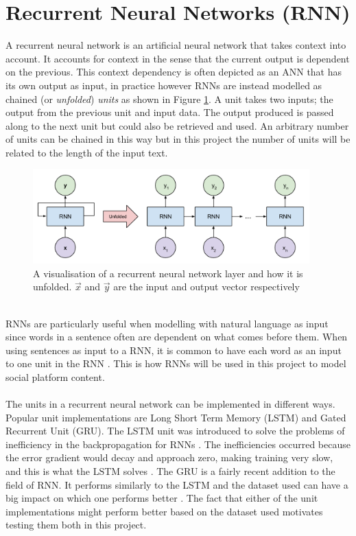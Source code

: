 \section{Recurrent Neural Networks (RNN)}\label{sec:rnn}
A recurrent neural network is an artificial neural network that takes context into account. It accounts for context in the sense that the current output is dependent on the previous. This context dependency is often depicted as an ANN that has its own output as input, in practice however RNNs are instead modelled as chained (or \textit{unfolded}) \textit{units} as shown in Figure \ref{fig:chained_units}. A unit takes two inputs; the output from the previous unit and input data. The output produced is passed along to the next unit but could also be retrieved and used. An arbitrary number of units can be chained in this way but in this project the number of units will be related to the length of the input text. 
\begin{figure}[h]
    \centering
    \includegraphics[width=0.95\textwidth]{figure/ann/rnn_unfold}
    \caption{A visualisation of a recurrent neural network layer and how it is unfolded. $\vec{x}$ and $\vec{y}$ are the input and output vector respectively}
    \label{fig:chained_units}
\end{figure}
\\
RNNs are particularly useful when modelling with natural language as input since words in a sentence often are dependent on what comes before them. When using sentences as input to a RNN, it is common to have each word as an input to one unit in the RNN \parencite{palangi2016deep}. This is how RNNs will be used in this project to model social platform content.
\\\\
The units in a recurrent neural network can be implemented in different ways. Popular unit implementations are Long Short Term Memory (LSTM) and Gated Recurrent Unit (GRU). The LSTM unit was introduced to solve the problems of inefficiency in the backpropagation for RNNs \parencite{LSTMdefined}. The inefficiencies occurred because the error gradient would decay and approach zero, making training very slow, and this is what the LSTM solves \parencite{hochreiter1998vanishing}. The GRU is a fairly recent addition to the field of RNN. It performs similarly to the LSTM and the dataset used can have a big impact on which one performs better \parencite{GRUchung2014empirical}. The fact that either of the unit implementations might perform better based on the dataset used motivates testing them both in this project.

